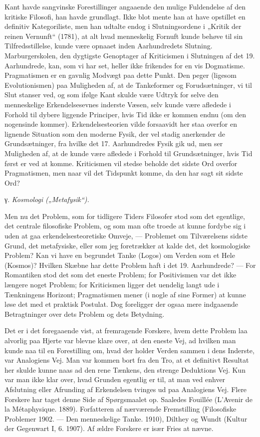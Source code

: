 \documentclass[12pt,a4paper,openany]{book}
\newcommand{\opage}[1]{\marginnote{\footnotesize\textit{[#1]}}}
\newcommand{\sectionhead}[2]{\par\bigskip\phantomsection\begin{center}#1 \textit{#2}\end{center}\addcontentsline{toc}{section}{#1 #2}\medskip\ignorespaces}
\begin{document}
Kant havde sangvinske Forestillinger angaaende den mulige Fuldendelse
af den kritiske Filosofi, han havde grundlagt. Ikke blot mente
han at have opstillet en definitiv Kategoriliste, men han udtalte endog
i Slutningsordene i „Kritik der reinen Vernunft“ (1781), at alt hvad
menneskelig Fornuft kunde behøve til sin Tilfredsstillelse, kunde
være opnaaet inden Aarhundredets Slutning. Marburgerskolen, den
dygtigste Genoptager af Kriticismen i Slutningen af det 19. Aarhundrede,
kan, som vi har set, heller ikke frikendes for en vis Dogmatisme.
Pragmatismen er en gavnlig Modvægt paa dette Punkt. Den peger
(ligesom Evolutionismen) paa Muligheden af, at de Tankeformer
og Forudsætninger, vi til Slut stanser ved, og som ifølge Kant
skulde være Udtryk for selve den menneskelige Erkendelsesevnes
inderste Væsen, selv kunde være afledede i Forhold til dybere liggende
Principer, hvis Tid ikke er kommen endnu (om den nogensinde
kommer). Erkendelsesteorien vilde forsaavidt her staa overfor
en lignende Situation som den moderne Fysik, der vel stadig anerkender
de Grundsætninger, fra hvilke det 17. Aarhundredes Fysik
gik ud, men ser Muligheden af, at de kunde være afledede i Forhold
til Grundsætninger, hvis Tid først er ved at komme. Kriticismen vil
stedse beholde det sidste Ord overfor Pragmatismen, men naar vil
det Tidspunkt komme, da den har sagt sit sidste Ord?

\sectionhead{γ.}{Kosmologi („Metafysik“).}

Men nu det Problem, som for tidligere Tiders Filosofer stod som
det egentlige, det centrale filosofiske Problem, og som man ofte troede
at kunne fordybe sig i uden at gaa erkendelsesteoretiske Omveje, ---
Problemet om Tilværelsens sidste Grund, det metafysiske, eller som
jeg foretrækker at kalde det, det kosmologiske Problem? Kan vi
have en begrundet Tanke (Logos) om Verden som et Hele (Kosmos)?
Hvilken Skæbne har dette Problem haft i det 19. Aarhundrede?
--- For Romantiken stod det som det eneste Problem; for Positivismen
var det ikke længere noget Problem; for Kriticismen ligger det uendelig
langt ude i Tænkningens Horizont; Pragmatismen mener (i
nogle af sine Former) at kunne løse det med et praktisk Postulat.
Dog foreligger der ogsaa mere indgaaende Betragtninger over dets
Problem og dets Betydning.

\opage{83}Det er i det foregaaende vist, at fremragende Forskere, hvem dette
Problem laa alvorlig paa Hjerte var blevne klare over, at den eneste
Vej, ad hvilken man kunde naa til en Forestilling om, hvad der holder
Verden sammen i dens Inderste, var Analogiens Vej. Man var
kommen bort fra den Tro, at et definitivt Resultat her skulde kunne
naas ad den rene Tænkens, den strenge Deduktions Vej. Kun var
man ikke klar over, hvad Grunden egentlig er til, at man ved enhver
Afslutning eller Afrunding af Erkendelsen tvinges ud paa Analogiens
Vej. Flere Forskere har taget denne Side af Spørgsmaalet op. Saaledes
Fouillée (L’Avenir de la Métaphysique. 1889). Forfatteren af
nærværende Fremstilling (Filosofiske Problemer 1902. --- Den menneskelige
Tanke. 1910), Dilthey og Wundt (Kultur der Gegenwart I,
6. 1907). Af ældre Forskere er især Fries at nævne.
\end{document}
